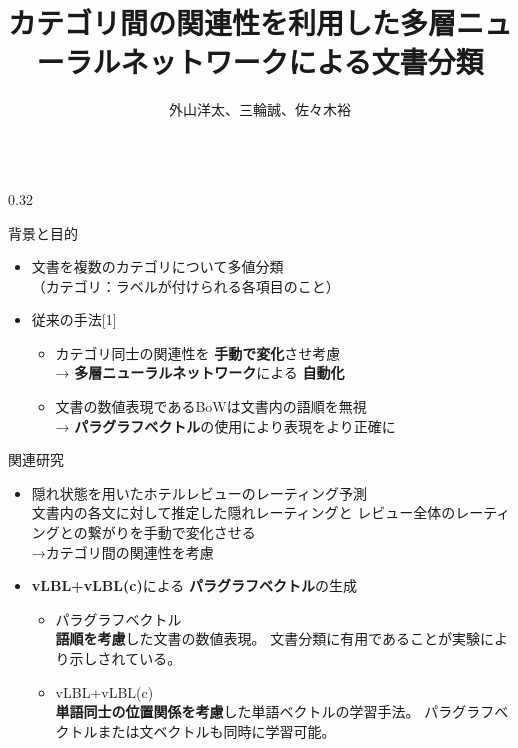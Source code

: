\documentclass[10pt,unicode]{beamer}
\title{カテゴリ間の関連性を利用した多層ニューラルネットワークによる文書分類}
\author{外山洋太、三輪誠、佐々木裕}
\institute{豊田工業大学 工学部 先端工学基礎学科}
\date{}
\newcommand{\columnsize}{0.32}
\newcommand{\arrow}{{\color{ttiblue} →}\hspace{1ex}}
\newcommand{\notable}[1]{\textbf{\color{orange} #1}}
\newcommand{\keyword}[1]{\textbf{\color{red} #1}}
\begin{document}
\begin{frame}{}
\maketitle
\begin{columns}[t]

\begin{column}{\columnsize\textwidth} %
  \begin{block}{背景と目的}
    \begin{itemize}
      \item 文書を複数のカテゴリについて多値分類 \\
      （カテゴリ：ラベルが付けられる各項目のこと）
      \item 従来の手法[1]
        \begin{itemize}
        \item カテゴリ同士の関連性を\notable{手動で変化}させ考慮 \\
          \arrow \keyword{多層ニューラルネットワーク}による\notable{自動化}
        \item 文書の数値表現であるBoWは文書内の語順を無視 \\
          \arrow \keyword{パラグラフベクトル}の使用により表現をより正確に
        \end{itemize}
    \end{itemize}
  \end{block}

  \begin{block}{関連研究}
    \begin{itemize}
      \item 隠れ状態を用いたホテルレビューのレーティング予測 \\
        文書内の各文に対して推定した隠れレーティングと
        レビュー全体のレーティングとの繋がりを手動で変化させる \\
        \arrow カテゴリ間の関連性を考慮
      \item \keyword{vLBL+vLBL(c)}による\keyword{パラグラフベクトル}の生成 \\
        \begin{itemize}
          \item {\normalsize パラグラフベクトル} \\
            \notable{語順を考慮}した文書の数値表現。
            文書分類に有用であることが実験により示しされている。
          \item {\normalsize vLBL+vLBL(c)} \\
            \notable{単語同士の位置関係を考慮}した単語ベクトルの学習手法。
            パラグラフベクトルまたは文ベクトルも同時に学習可能。
        \end{itemize}
    \end{itemize}
  \end{block}


\end{column}
\end{columns}
\end{frame}
\end{document}
